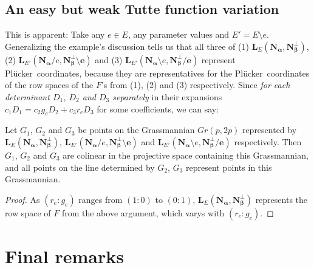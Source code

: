 \documentclass[Unicode]{cedram-alco}
\newcommand{\ext}[1]{\ensuremath{\mathbf{#1}}}
\newcommand{\Plucker}{Pl\"{u}cker\ }
\begin{document}
\subsection{An easy but weak Tutte function variation}

This is apparent:  Take any $e\in E$, any parameter
values and $E'=E\setminus e$. Generalizing the example's discussion tells us that all three of
(1) $\ext{L}_E(\ext{N_\alpha},\ext{N_\beta^\perp})$,
(2) $\ext{L}_{E'}(\ext{N_\alpha}/e,\ext{N_\beta^\perp\setminus e})$ and
(3) $\ext{L}_{E'}(\ext{N_\alpha}\setminus e,\ext{N_\beta^\perp/e})$ represent
\Plucker coordinates, because they are representatives for the \Plucker coordinates
of the row spaces of the $F$'s from (1), (2) and (3) respectively.  Since \emph{for each determinant
$D_1$, $D_2$ and $D_3$ separately} in their expansions $c_1 D_1 = c_2 g_e D_2 + c_3 r_e D_3$ for
some coefficients, we can say:

\begin{prop}
Let $G_1$, $G_2$ and $G_3$ be points on the Grassmannian $Gr(p,2p)$ represented by
$\ext{L}_E(\ext{N_\alpha},\ext{N_\beta^\perp})$,
$\ext{L}_{E'}(\ext{N_\alpha}/e,\ext{N_\beta^\perp\setminus e})$ and
$\ext{L}_{E'}(\ext{N_\alpha}\setminus e,\ext{N_\beta^\perp/e})$ respectively. Then
$G_1$, $G_2$ and $G_3$ are colinear in the projective space containing this Grassmannian, and
all points on the line determined by $G_2$, $G_3$ represent points in this Grassmannian.
\end{prop}
\begin{proof}
  As $(r_e:g_e)$ ranges from $(1:0)$ to $(0:1)$, $\ext{L}_E(\ext{N_\alpha},\ext{N_\beta^\perp})$ represents
  the row space of $F$ from the above argument, which varys with $(r_e:g_e)$.
\end{proof}




\section{Final remarks}





\end{document}
